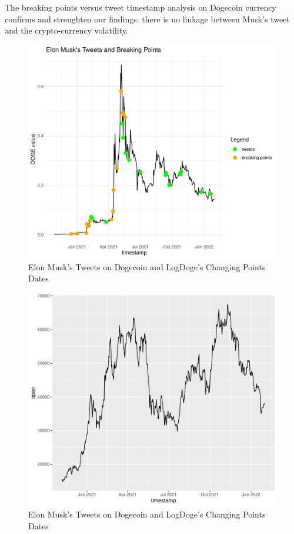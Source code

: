 \documentclass[
]{article}
\begin{document}
The breaking points versus tweet timestamp analysis on Dogecoin currency
confirms and strenghten our findings: there is no linkage between Musk's
tweet and the crypto-currency volatility.

\begin{figure}
\centering
\includegraphics{Trial1_files/figure-latex/fig21-1.pdf}
\caption{\label{fig:fig21}Elon Musk's Tweets on Dogecoin and LogDoge's
Changing Points Dates}
\end{figure}

\begin{figure}
\centering
\includegraphics{Trial1_files/figure-latex/fig25-1.pdf}
\caption{\label{fig:fig25}Elon Musk's Tweets on Dogecoin and LogDoge's
Changing Points Dates}
\end{figure}
\end{document}
